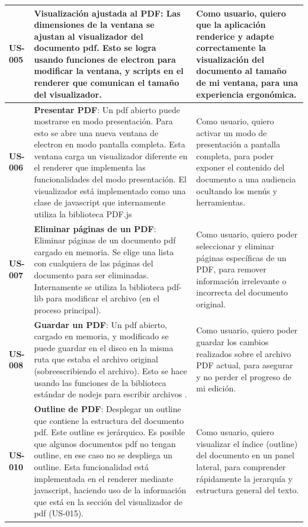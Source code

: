 \begin{longtable}{|l||p{7cm}|p{4.5cm}|}
\hline
\textbf{US-005} & \textbf{Visualización ajustada al PDF}: Las dimensiones de la ventana se ajustan al visualizador del documento pdf. Esto se logra usando funciones de electron para modificar la ventana, y scripts en el renderer que comunican el tamaño del visualizador. & Como usuario, quiero que la aplicación renderice y adapte correctamente la visualización del documento al tamaño de mi ventana, para una experiencia ergonómica.\\
\hline
\textbf{US-006} & \textbf{Presentar PDF}:  Un pdf abierto puede mostrarse en modo presentación. Para esto se abre una nueva ventana de electron en modo pantalla completa. Esta ventana carga un visualizador diferente en el renderer que implementa las funcionalidades del modo presentación. El visualizador está implementado como una clase de javascript que internamente utiliza la biblioteca PDF.js & Como usuario, quiero activar un modo de presentación a pantalla completa, para poder exponer el contenido del documento a una audiencia ocultando los menús y herramientas.\\
\hline
\textbf{US-007} & \textbf{Eliminar páginas de un PDF}:  Eliminar páginas de un documento pdf cargado en memoria. Se elige una lista con cualquiera de las páginas del documento para ser eliminadas. Internamente se utiliza la biblioteca pdf-lib para modificar el archivo (en el proceso principal). & Como usuario, quiero poder seleccionar y eliminar páginas específicas de un PDF, para remover información irrelevante o incorrecta del documento original.\\
\hline
\hline
\textbf{US-008} & \textbf{Guardar un PDF}:  Un pdf abierto, cargado en memoria, y modificado se puede guardar en el disco en la misma ruta que estaba el archivo original (sobreescribiendo el archivo). Esto se hace usando las funciones de la biblioteca estándar de nodejs para escribir archivos .& Como usuario, quiero poder guardar los cambios realizados sobre el archivo PDF actual, para asegurar y no perder el progreso de mi edición.\\
\hline
\hline
\textbf{US-010} & \textbf{Outline de PDF}:  Desplegar un outline que contiene la estructura del documento pdf. Este outline es jerárquico. Es posible que algunos documentos pdf no tengan outline, en ese caso no se despliega un outline. Esta funcionalidad está implementada en el renderer mediante javascript, haciendo uso de la información que está en la sección del visualizador de pdf (US-015). &  Como usuario, quiero visualizar el índice (outline) del documento en un panel lateral, para comprender rápidamente la jerarquía y estructura general del texto.\\

\end{longtable}
